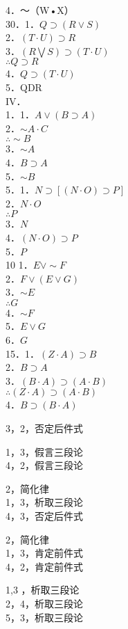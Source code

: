 4．～（W•X）\\
30．1．$Q \supset(R \vee S)$\\
2．$(T \cdot U) \supset R$\\
3．$(R \bigvee S) \supset(T \cdot U)$\\
$\therefore Q \supset R$\\
4．$Q \supset(T \cdot U)$\\
5．QDR\\
IV．\\
1．1．$A \vee(B \supset A)$\\
2．$\sim A \cdot C$\\
$\therefore \sim B$\\
3．$\sim A$\\
4．$B \supset A$\\
5．$\sim B$\\
5．1．$N \supset[(N \cdot O) \supset P]$\\
2．$N \cdot O$\\
$\therefore P$\\
3．$N$\\
4．$(N \cdot O) \supset P$\\
5．$P$\\
10 1．$E \vee \sim F$\\
2．$F \vee(E \vee G)$\\
3．$\sim E$\\
$\therefore G$\\
4．$\sim F$\\
5．$E \vee G$\\
6．$G$\\
15．1．$(Z \cdot A) \supset B$\\
2．$B \supset A$\\
3．$(B \cdot A) \supset(A \cdot B)$\\
$\therefore(Z \cdot A) \supset(A \cdot B)$\\
4．$B \supset(B \cdot A)$

3，2，否定后件式

1，3，假言三段论\\
4，2，假言三段论

2，简化律\\
1，3，析取三段论\\
4，3，否定后件式

2，简化律\\
1，3，肯定前件式\\
4，2，肯定前件式

1,3 ，析取三段论\\
2，4，析取三段论\\
5，3，析取三段论

